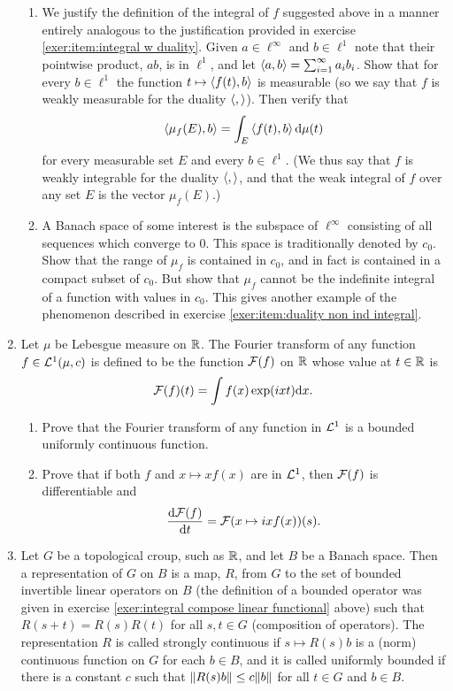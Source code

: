 \begin{enumerate}[label=\arabic*),ref=\arabic*]
\begin{enumerate}[label=\alph*)]
    \item We justify the definition of the integral of $f$ suggested above in a manner entirely analogous to the justification provided in exercise \ref{exer:item:integral w duality}. Given $a\in\ell^\infty$ and $b\in\ell^1$ note that their pointwise product, $ab$, is in $\ell^1$, and let $\left\langle a,b\right\rangle=\sum_{i=1}^\infty a_ib_i$. Show that for every $b\in\ell^1$ the function $t\mapsto\left\langle f(t),b\right\rangle$ is measurable (so we say that $f$ is weakly measurable for the duality $\left\langle,\right\rangle$). Then verify that \[\left\langle\mu_f(E), b\right\rangle=\int_E\left\langle f(t),b\right\rangle\dd\mu(t)\] for every measurable set $E$ and every $b\in\ell^1$. (We thus say that $f$ is weakly integrable for the duality $\left\langle,\right\rangle$, and that the weak integral of $f$ over any set $E$ is the vector $\mu_f(E)$.)
    
    \item A Banach space of some interest is the subspace of $\ell^\infty$ consisting of all sequences which converge to 0. This space is traditionally denoted by $c_0$. Show that the range of $\mu_f$ is contained in $c_0$, and in fact is contained in a compact subset of $c_0$. But show that $\mu_f$ cannot be the indefinite integral of a function with values in $c_0$. This gives another example of the phenomenon described in exercise \ref{exer:item:duality non ind integral}.
\end{enumerate}

\item Let $\mu$ be Lebesgue measure on $\mathbb{R}$. The Fourier transform of any function $f\in{\cal L}^1(\mu,c)$ is defined to be the function ${\cal F}(f)$ on $\mathbb{R}$ whose value at $t\in\mathbb{R}$ is \[{\cal F}(f)(t)=\int f(x)\exp(ixt)\dd x.\]
\begin{enumerate}[label=\alph*]
    \item Prove that the Fourier transform of any function in ${\cal L}^1$ is a bounded uniformly continuous function.

    \item Prove that if both $f$ and $x\mapsto xf(x)$ are in ${\cal L}^1$, then ${\cal F}(f)$ is differentiable and \[\dv{{\cal F}(f)}{t}(s)={\cal F}(x\mapsto ixf(x))(s).\]
\end{enumerate}

\item Let $G$ be a topological croup, such as $\mathbb{R}$, and let $B$ be a Banach space. Then a representation of $G$ on $B$ is a map, $R$, from $G$ to the set of bounded invertible linear operators on $B$ (the definition of a bounded operator was given in exercise \ref{exer:integral compose linear functional} above) such that $R(s+t)=R(s)R(t)$ for all $s,t\in G$ (composition of operators). The representation $R$ is called strongly continuous if $s\mapsto R(s)b$ is a (norm) continuous function on $G$ for each $b\in B$, and it is called uniformly bounded if there is a constant $c$ such that $\norm{R(s)b}\leq c\norm{b}$ for all $t\in G$ and $b\in B$.


\end{enumerate}
